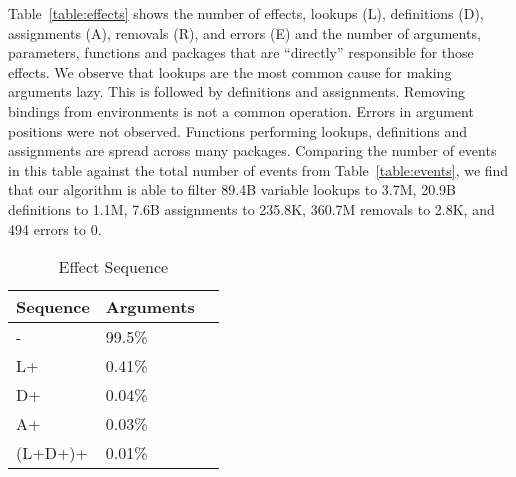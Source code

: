 \documentclass[review,nonacm,screen,acmsmall,anonymous=true]{acmart}
\begin{document}
Table~\ref{table:effects} shows the number of effects, lookups (L), definitions
(D), assignments (A), removals (R), and errors (E) and the number of arguments,
parameters, functions and packages that are ``directly'' responsible for those
effects. We observe that lookups are the most common cause for making arguments
lazy. This is followed by definitions and assignments. Removing bindings from
environments is not a common operation. Errors in argument positions were not
observed. Functions performing lookups, definitions and assignments are spread
across many packages.
%
Comparing the number of events in this table against the total number of events
from Table~\ref{table:events}, we find that our algorithm is able to filter
89.4B variable lookups to 3.7M, 20.9B definitions to 1.1M, 7.6B assignments to
235.8K, 360.7M removals to 2.8K, and 494 errors to 0.

\begin{wraptable}{r}{5cm}
  \vspace{-3mm}
  \small
  \caption{Effect Sequence} \label{table:effectseq}
  \centering
  \begin{tabular}{lll}
    \toprule
    \textbf{Sequence}&\textbf{Arguments}\\
    \midrule
    -&99.5\%\\
    L+&0.41\%\\
    D+&0.04\%\\
    A+&0.03\%\\
    (L+D+)+&0.01\%\\
    \bottomrule
  \end{tabular}
\end{wraptable}
\end{document}
